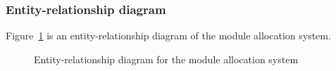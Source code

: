 
\subsubsection{Entity-relationship diagram}

Figure~\ref{er_diagram} is an entity-relationship diagram of the module
allocation system.

\begin{landscape}
  \begin{figure}
    \centering
    \caption{Entity-relationship diagram for the module allocation system}
    \label{er_diagram}
  \end{figure}
\end{landscape}
